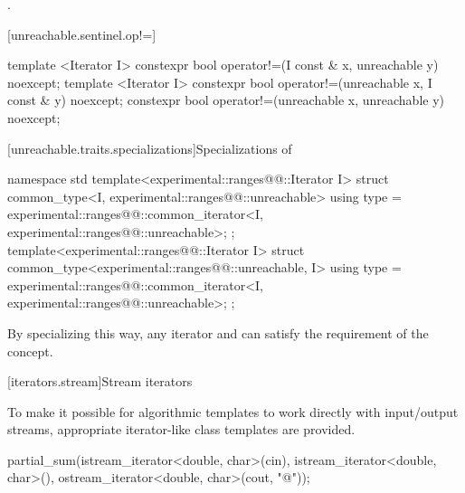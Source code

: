 \begin{addedblock}
\begin{itemdescr}
\pnum
\returns {}.
\end{itemdescr}

[unreachable.sentinel.op!=]{}

%
%
\begin{itemdecl}
template <Iterator I>
  constexpr bool operator!=(I const & x, unreachable y) noexcept;
template <Iterator I>
  constexpr bool operator!=(unreachable x, I const & y) noexcept;
constexpr bool operator!=(unreachable x, unreachable y) noexcept;
\end{itemdecl}

\begin{itemdescr}
\pnum
\returns
{}
\end{itemdescr}

[unreachable.traits.specializations]{Specializations of }

%
\begin{itemdecl}
namespace std {
  template<experimental::ranges@@::Iterator I>
  struct common_type<I, experimental::ranges@@::unreachable> {
    using type = experimental::ranges@@::common_iterator<I, experimental::ranges@@::unreachable>;
  };
  template<experimental::ranges@@::Iterator I>
  struct common_type<experimental::ranges@@::unreachable, I> {
    using type = experimental::ranges@@::common_iterator<I, experimental::ranges@@::unreachable>;
  };
}
\end{itemdecl}

\begin{itemdescr}
\pnum
\enternote By specializing  this way, any iterator and
 can satisfy the  requirement of the
 concept.\exitnote
\end{itemdescr}

\end{addedblock}

[iterators.stream]{Stream iterators}

\pnum
To make it possible for algorithmic templates to work directly with input/output streams, appropriate
iterator-like
class templates
are provided.

\enterexample
\begin{codeblock}
partial_sum(istream_iterator<double, char>(cin),
  istream_iterator<double, char>(),
  ostream_iterator<double, char>(cout, "@\textbackslash@n"));
\end{codeblock}

